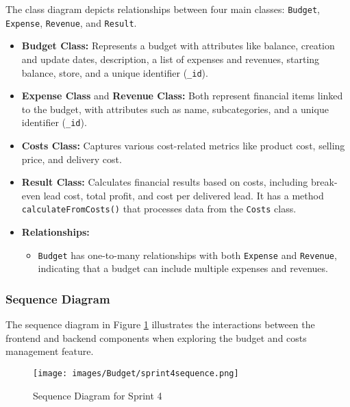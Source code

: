 The class diagram depicts relationships between four main classes: \texttt{Budget}, \texttt{Expense}, \texttt{Revenue}, and \texttt{Result}.

\begin{itemize}
    \item \textbf{Budget Class:} Represents a budget with attributes like balance, creation and update dates, description, a list of expenses and revenues, starting balance, store, and a unique identifier (\texttt{\_id}).
    
    \item \textbf{Expense Class} and \textbf{Revenue Class:} Both represent financial items linked to the budget, with attributes such as name, subcategories, and a unique identifier (\texttt{\_id}).

    \item \textbf{Costs Class:} Captures various cost-related metrics like product cost, selling price, and delivery cost.

    \item \textbf{Result Class:} Calculates financial results based on costs, including break-even lead cost, total profit, and cost per delivered lead. It has a method \texttt{calculateFromCosts()} that processes data from the \texttt{Costs} class.
    
    \item \textbf{Relationships:}
    \begin{itemize}
        \item \texttt{Budget} has one-to-many relationships with both \texttt{Expense} and \texttt{Revenue}, indicating that a budget can include multiple expenses and revenues.
    \end{itemize}
\end{itemize}

\subsubsection{Sequence Diagram}

The sequence diagram in Figure \ref{fig:sequence_sprint4} illustrates the interactions between the frontend and backend components when exploring the budget and costs management feature.

\begin{figure}[H]
    \centering
    \texttt{[image: images/Budget/sprint4sequence.png]}
    \caption{Sequence Diagram for Sprint 4}
    \label{fig:sequence_sprint4}
\end{figure}

